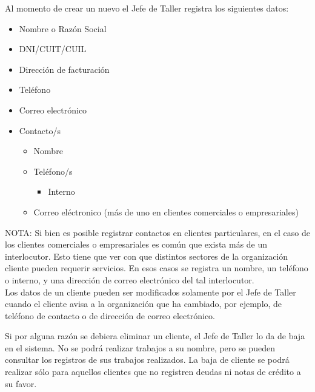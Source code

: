 \documentclass[12pt]{extarticle}
\begin{document}
\begin{spacing}{1.2}
    Al momento de crear un nuevo el Jefe de Taller registra los siguientes datos:
    \begin{itemize}
        \item Nombre o Razón Social
        \item DNI/CUIT/CUIL
        \item Dirección de facturación
        \item Teléfono
        \item Correo electrónico
        \item Contacto/s
        	\begin{itemize}
				\item Nombre	
		        \item Teléfono/s
		        \begin{itemize}
			        \item Interno	        
		        \end{itemize}
		        \item Correo eléctronico (más de uno en clientes comerciales o empresariales)\\        	
        	\end{itemize}
    \end{itemize}

        NOTA: Si bien es posible registrar contactos en clientes particulares, en el caso de los clientes comerciales o empresariales es común que exista más de un interlocutor. Esto tiene que ver con que distintos sectores de la organización cliente pueden requerir servicios. En esos casos se registra un nombre, un teléfono o interno, y una dirección de correo electrónico del tal interlocutor. \\

    Los datos de un cliente pueden ser modificados solamente por el Jefe de Taller cuando el cliente avisa a la organización que ha cambiado, por ejemplo, de teléfono de contacto o de dirección de correo electrónico.

    Si por alguna razón se debiera eliminar un cliente, el Jefe de Taller lo da de baja en el sistema. No se podrá realizar trabajos a su nombre, pero se pueden consultar los registros de sus trabajos realizados. La baja de cliente se podrá realizar sólo para aquellos clientes que no registren deudas ni notas de crédito a su favor.
    

\end{spacing}
\end{document}
